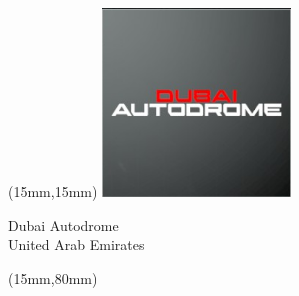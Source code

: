 \begin{textblock*}{50mm}(15mm,15mm)%
\includegraphics[width=50mm]{LG/2015-05-20_00081.png}
\par Dubai Autodrome\\ United Arab Emirates
\end{textblock*}
\begin{textblock*}{185mm}(15mm,80mm)%
\end{textblock*}
